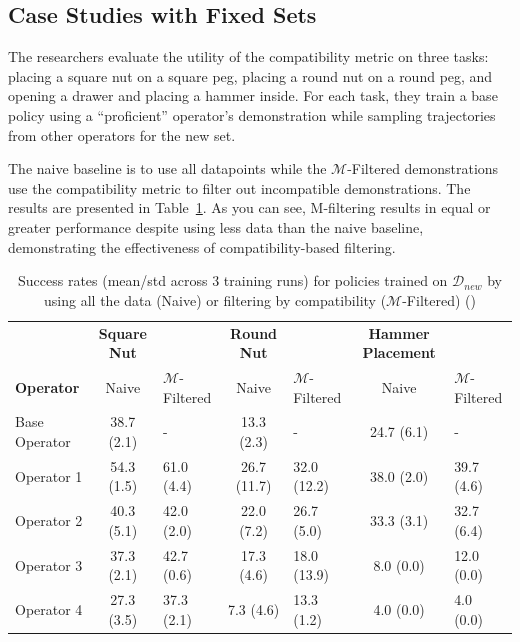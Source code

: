 \documentclass[
  letterpaper,
  numbers=noenddot,
  DIV=11,
  oneside]{scrreprt}
\theoremstyle{remark}
\begin{document}
\subsection{Case Studies with Fixed
Sets}\label{case-studies-with-fixed-sets}

The researchers evaluate the utility of the compatibility metric on
three tasks: placing a square nut on a square peg, placing a round nut
on a round peg, and opening a drawer and placing a hammer inside. For
each task, they train a base policy using a ``proficient'' operator's
demonstration while sampling trajectories from other operators for the
new set.

The naive baseline is to use all datapoints while the
\(\mathcal{M}\)-Filtered demonstrations use the compatibility metric to
filter out incompatible demonstrations. The results are presented in
Table~\ref{tbl-m_filter_table}. As you can see, M-filtering results in
equal or greater performance despite using less data than the naive
baseline, demonstrating the effectiveness of compatibility-based
filtering.

\begin{longtable}[]{@{}lclclcl@{}}
\caption{Success rates (mean/std across 3 training runs) for policies
trained on \(\mathcal{D}_{new}\) by using all the data (Naive) or
filtering by compatibility (\(\mathcal{M}\)-Filtered)
()}\label{tbl-m_filter_table}\tabularnewline
\toprule\noalign{}
\endfirsthead
\endhead
\bottomrule\noalign{}
\endlastfoot
& \textbf{Square Nut} & & \textbf{Round Nut} & & \textbf{Hammer
Placement} & \\
\textbf{Operator} & Naive & \(\mathcal{M}\)-Filtered & Naive &
\(\mathcal{M}\)-Filtered & Naive & \(\mathcal{M}\)-Filtered \\
Base Operator & 38.7 (2.1) & - & 13.3 (2.3) & - & 24.7 (6.1) & - \\
Operator 1 & 54.3 (1.5) & 61.0 (4.4) & 26.7 (11.7) & 32.0 (12.2) & 38.0
(2.0) & 39.7 (4.6) \\
Operator 2 & 40.3 (5.1) & 42.0 (2.0) & 22.0 (7.2) & 26.7 (5.0) & 33.3
(3.1) & 32.7 (6.4) \\
Operator 3 & 37.3 (2.1) & 42.7 (0.6) & 17.3 (4.6) & 18.0 (13.9) & 8.0
(0.0) & 12.0 (0.0) \\
Operator 4 & 27.3 (3.5) & 37.3 (2.1) & 7.3 (4.6) & 13.3 (1.2) & 4.0
(0.0) & 4.0 (0.0) \\
\end{longtable}
\end{document}

